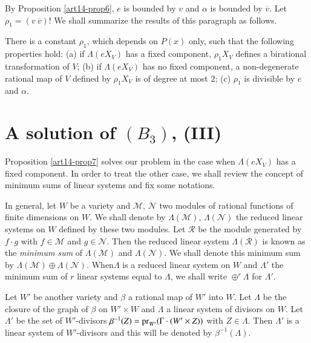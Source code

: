 By Proposition \ref{art14-prop6}, $e$ is bounded by $v$ and $\alpha$ is bounded by $\overline{v}$. Let $\rho_{1}=(v \ \overline{v})$! We shall summarize the results of this paragraph as follows.

\begin{proposition}\label{art14-prop7}
There is a constant $\rho_{1}$, which depends on $P(x)$ only, such that the following properties hold: {\rm(a)} if $\Lambda(eX_{V})$ has a fixed component, $\rho_{1}X_{V}$ defines a birational transformation of $V$; {\rm(b)} if $\Lambda(eX_{V})$ has no fixed component, a non-degenerate rational map of $V$ defined by $\rho_{1}X_{V}$ is of degree at most $2$; {\rm(c)} $\rho_{1}$ is divisible by $e$ and $\alpha$.
\end{proposition}

\section{A solution of \texorpdfstring{$(B_{3})$}{B3}, (III)}\label{art14-sec7}

Proposition \ref{art14-prop7} solves our problem in the case when $\Lambda(eX_{V})$ has a fixed component. In order to treat the other case, we shall review the concept of minimum sums of linear systems and fix some notations.

In general, let $W$ be a variety and $\mathscr{M}$, $\mathscr{N}$ two modules of rational functions of finite dimensions on $W$. We shall denote by $\Lambda(\mathscr{M})$, $\Lambda(\mathscr{N})$ the reduced linear systems on $W$ defined by these two modules. Let $\mathscr{R}$ be the module generated by $f\cdot g$ with $f\in \mathscr{M}$ and $g\in \mathscr{N}$. Then the reduced linear system $\Lambda(\mathscr{R})$ is known as the {\em minimum sum} of $\Lambda(\mathscr{M})$ and $\Lambda(\mathscr{N})$. We shall denote this minimum sum by $\Lambda(\mathscr{M})\oplus \Lambda(\mathscr{N})$. When\pageoriginale $\Lambda$ is a reduced linear system on $W$ and $\Lambda'$ the minimum sum of $r$ linear systems equal to $\Lambda$, we shall write $\oplus^{r}\Lambda$ for $\Lambda'$.

Let $W'$ be another variety and $\beta$ a rational map of $W'$ into $W$. Let $\Lambda$ be the closure of the graph of $\beta$ on $W'\times W$ and $\Lambda$ a linear system of divisors on $W$. Let $\Lambda'$ be the set of $W'$-divisors $\beta^{-1}(Z)=\operatorname{\mathrm{pr}}_{W'}(\Gamma\cdot (W'\times Z))$ with $Z\in \Lambda$. Then $\Lambda'$ is a linear system of $W'$-divisors and this will be denoted by $\beta^{-1}(\Lambda)$.

